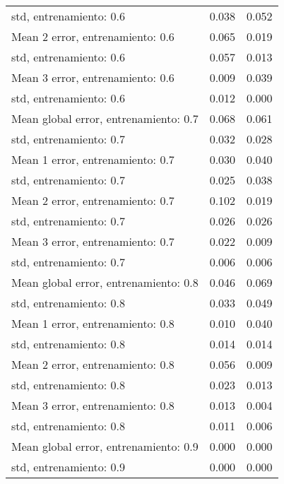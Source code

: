 \begin{longtable}{p{4cm}|p{1.5cm}|p{1.5cm}}
std, entrenamiento: 0.6               &              0.038 &        0.052 \\
Mean 2 error, entrenamiento: 0.6      &              0.065 &        0.019 \\
std, entrenamiento: 0.6               &              0.057 &        0.013 \\
Mean 3 error, entrenamiento: 0.6      &              0.009 &        0.039 \\
std, entrenamiento: 0.6               &              0.012 &        0.000 \\
Mean global error, entrenamiento: 0.7 &              0.068 &        0.061 \\
std, entrenamiento: 0.7               &              0.032 &        0.028 \\
Mean 1 error, entrenamiento: 0.7      &              0.030 &        0.040 \\
std, entrenamiento: 0.7               &              0.025 &        0.038 \\
Mean 2 error, entrenamiento: 0.7      &              0.102 &        0.019 \\
std, entrenamiento: 0.7               &              0.026 &        0.026 \\
Mean 3 error, entrenamiento: 0.7      &              0.022 &        0.009 \\
std, entrenamiento: 0.7               &              0.006 &        0.006 \\
Mean global error, entrenamiento: 0.8 &              0.046 &        0.069 \\
std, entrenamiento: 0.8               &              0.033 &        0.049 \\
Mean 1 error, entrenamiento: 0.8      &              0.010 &        0.040 \\
std, entrenamiento: 0.8               &              0.014 &        0.014 \\
Mean 2 error, entrenamiento: 0.8      &              0.056 &        0.009 \\
std, entrenamiento: 0.8               &              0.023 &        0.013 \\
Mean 3 error, entrenamiento: 0.8      &              0.013 &        0.004 \\
std, entrenamiento: 0.8               &              0.011 &        0.006 \\
Mean global error, entrenamiento: 0.9 &              0.000 &        0.000 \\
std, entrenamiento: 0.9               &              0.000 &        0.000 \\

\end{longtable}
